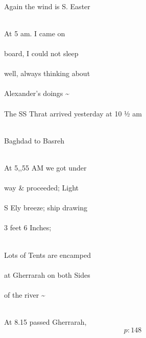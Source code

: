 \documentclass{report}
\begin{document}
	\par{
 	\ \\
	}

	\par{
 	Again the wind is S. Easter\ \\\ \\
	}

	\par{
 	At 5 am. I came on\ \\\ \\board, I could not sleep\ \\\ \\well, always thinking about\ \\\ \\Alexander’s doings \~{}\ \\\ \\The SS Thrat arrived yesterday at 10 ½ am\ \\\ \\
	}

	\par{
 	Baghdad to Basreh\ \\\ \\
	}

	\par{
 	At 5,,55 AM we got under\ \\\ \\way \& proceeded; Light\ \\\ \\S Ely breeze; ship drawing\ \\\ \\3 feet 6 Inches;\ \\\ \\
	}

	\par{
 	Lots of Tents are encamped\ \\\ \\at Gherrarah on both Sides\ \\\ \\of the river \~{}\ \\\ \\
	}

	\par{
 	At 8.15 passed Gherrarah,\ \\
  \[p: 148 \]

	}


\end{document}
